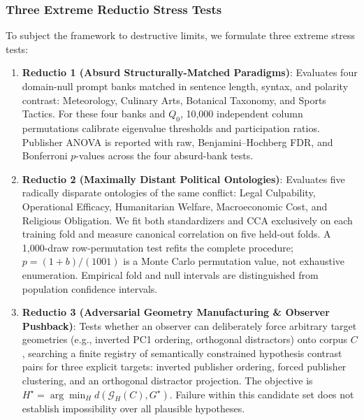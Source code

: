 \subsubsection{Three Extreme Reductio Stress Tests}
To subject the framework to destructive limits, we formulate three extreme stress tests:
\begin{enumerate}
    \item \textbf{Reductio 1 (Absurd Structurally-Matched Paradigms)}: Evaluates four domain-null prompt banks matched in sentence length, syntax, and polarity contrast: Meteorology, Culinary Arts, Botanical Taxonomy, and Sports Tactics. For these four banks and $Q_0$, 10,000 independent column permutations calibrate eigenvalue thresholds and participation ratios. Publisher ANOVA is reported with raw, Benjamini--Hochberg FDR, and Bonferroni $p$-values across the four absurd-bank tests.
    \item \textbf{Reductio 2 (Maximally Distant Political Ontologies)}: Evaluates five radically disparate ontologies of the same conflict: Legal Culpability, Operational Efficacy, Humanitarian Welfare, Macroeconomic Cost, and Religious Obligation. We fit both standardizers and CCA exclusively on each training fold and measure canonical correlation on five held-out folds. A 1,000-draw row-permutation test refits the complete procedure; $p=(1+b)/(1001)$ is a Monte Carlo permutation value, not exhaustive enumeration. Empirical fold and null intervals are distinguished from population confidence intervals.
    \item \textbf{Reductio 3 (Adversarial Geometry Manufacturing \& Observer Pushback)}: Tests whether an observer can deliberately force arbitrary target geometries (e.g., inverted PC1 ordering, orthogonal distractors) onto corpus $C$, searching a finite registry of semantically constrained hypothesis contrast pairs for three explicit targets: inverted publisher ordering, forced publisher clustering, and an orthogonal distractor projection. The objective is $H^\star=\arg\min_H d(\mathcal{G}_H(C),G^\star)$. Failure within this candidate set does not establish impossibility over all plausible hypotheses.
\end{enumerate}

